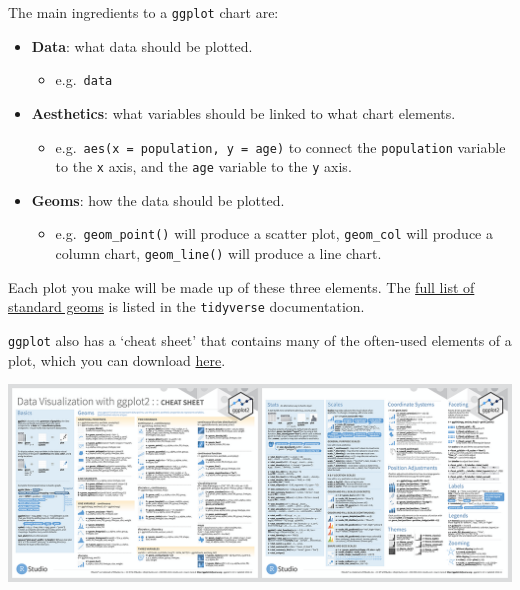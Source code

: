 \documentclass[
]{book}
\providecommand{\tightlist}{%
  \setlength{\itemsep}{0pt}\setlength{\parskip}{0pt}}
\begin{document}
The main ingredients to a \texttt{ggplot} chart are:

\begin{itemize}
\tightlist
\item
  \textbf{Data}: what data should be plotted.

  \begin{itemize}
  \tightlist
  \item
    e.g.~\texttt{data}
  \end{itemize}
\item
  \textbf{Aesthetics}: what variables should be linked to what chart elements.

  \begin{itemize}
  \tightlist
  \item
    e.g.~\texttt{aes(x\ =\ population,\ y\ =\ age)} to connect the \texttt{population} variable to the \texttt{x} axis, and the \texttt{age} variable to the \texttt{y} axis.
  \end{itemize}
\item
  \textbf{Geoms}: how the data should be plotted.

  \begin{itemize}
  \tightlist
  \item
    e.g.~\texttt{geom\_point()} will produce a scatter plot, \texttt{geom\_col} will produce a column chart, \texttt{geom\_line()} will produce a line chart.
  \end{itemize}
\end{itemize}

Each plot you make will be made up of these three elements. The \href{https://ggplot2.tidyverse.org/reference/}{full list of standard geoms} is listed in the \texttt{tidyverse} documentation.

\texttt{ggplot} also has a `cheat sheet' that contains many of the often-used elements of a plot, which you can download \href{https://github.com/rstudio/cheatsheets/raw/master/data-visualization-2.1.pdf}{here}.

\begin{center}\includegraphics[width=17.08in]{atlas/ggplot_cheat_sheet} \end{center}
\end{document}
